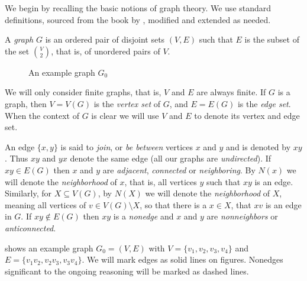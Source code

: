 We begin by recalling the basic notions of graph theory. We use standard definitions, sourced from the book by \citeauthor{BB98} , modified and extended as needed.

\begin{defn}[graph]
  A \emph{graph} $G$ is an ordered pair of disjoint sets $(V, E)$ such that $E$ is the subset of the set $V \choose 2$, that is, of unordered pairs of $V$.
\end{defn}

\begin{wrapfigure}{r}{0.4\textwidth}
  \centering{}
  \caption{An example graph $G_0$}
  \label{fig:examplePath}
\end{wrapfigure}

We will only consider finite graphs, that is, $V$ and $E$ are always finite. If $G$ is a graph, then $V = V(G)$ is the \emph{vertex set} of $G$, and $E = E(G)$ is the \emph{edge set}. When the context of $G$ is clear we will use $V$ and $E$ to denote its vertex and edge set.

An edge $\{x, y\}$ is said to \emph{join}, or \emph{be between} vertices $x$ and $y$ and is denoted by $xy$. Thus $xy$ and $yx$ denote the same edge (all our graphs are \emph{undirected}). If $xy \in E(G)$ then $x$ and $y$ are \emph{adjacent}, \emph{connected} or \emph{neighboring}. By $N(x)$ we will denote the \emph{neighborhood} of $x$, that is, all vertices $y$ such that $xy$ is an edge. Similarly, for $X \subseteq V(G)$, by $N(X)$ we will denote the \emph{neighborhood} of $X$, meaning all vertices of $v \in V(G) \setminus X$, so that there is a $x \in X$, that $xv$ is an edge in $G$. If $xy \notin E(G)$ then $xy$ is a \emph{nonedge} and $x$ and $y$ are \emph{nonneighbors} or \emph{anticonnected}.

 shows an example graph $G_0 = (V, E)$ with $V = \{v_1, v_2, v_3, v_4\}$ and $E = \{v_1v_2, v_2v_3, v_3v_4\}$. We will mark edges as solid lines on figures. Nonedges significant to the ongoing reasoning will be marked as dashed lines.


